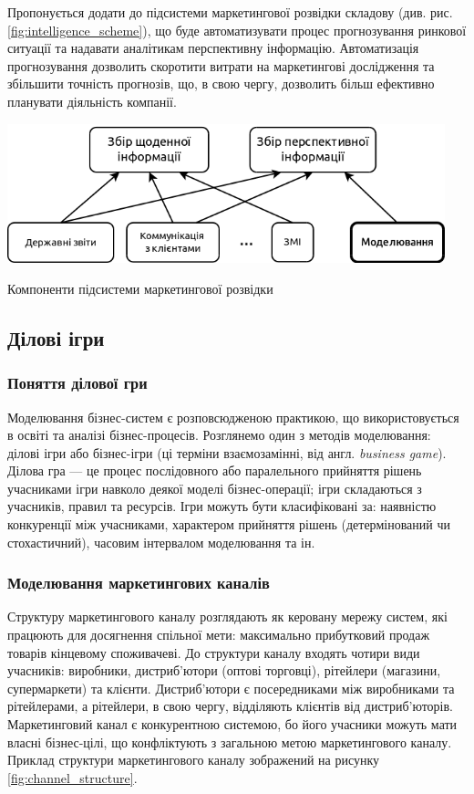 Пропонується додати до підсистеми маркетингової розвідки складову (див. рис. \ref{fig:intelligence_scheme}), що буде автоматизувати процес прогнозування ринкової ситуації та надавати аналітикам перспективну інформацію. Автоматизація прогнозування дозволить скоротити витрати на маркетингові дослідження та збільшити точність прогнозів, що, в свою чергу, дозволить більш ефективно планувати діяльність компанії.

            \begin{stdfigure}
                \includegraphics[width=5in]{images/intelligence_scheme.png}
                \caption{Компоненти підсистеми маркетингової розвідки}
                \label{fig:intelligence_scheme}
            \end{stdfigure}    
  
    \subsection{Ділові ігри}
        \subsubsection{Поняття ділової гри}
Моделювання бізнес-систем є розповсюдженою практикою, що використовується в освіті та аналізі бізнес-процесів. Розглянемо один з методів моделювання: ділові ігри або бізнес-ігри (ці терміни взаємозамінні, від англ. {\it business game}). Ділова гра --- це процес послідовного або паралельного прийняття рішень учасниками ігри навколо деякої моделі бізнес-операції; ігри складаються з учасників, правил та ресурсів\cite{bg1, bg2}. Ігри можуть бути класифіковані за\cite{bg3}: наявністю конкуренції між учасниками, характером прийняття рішень (детермінований чи стохастичний), часовим інтервалом моделювання та ін.
        
        \subsubsection{Моделювання маркетингових каналів}
Структуру маркетингового каналу розглядають як керовану мережу систем, які працюють для досягнення спільної мети\cite{stern}: 
максимально прибутковий продаж товарів кінцевому споживачеві. До структури каналу входять чотири види учасників: виробники, дистриб’ютори (оптові торговці), рітейлери (магазини, супермаркети) та клієнти. Дистриб’ютори є посередниками між виробниками та рітейлерами, а рітейлери, в свою чергу, відділяють клієнтів від дистриб’юторів. Маркетинговий канал є конкурентною системою, бо його учасники можуть мати власні бізнес-цілі, що конфліктують з загальною метою маркетингового каналу. Приклад структури маркетингового каналу зображений на рисунку \ref{fig:channel_structure}.

